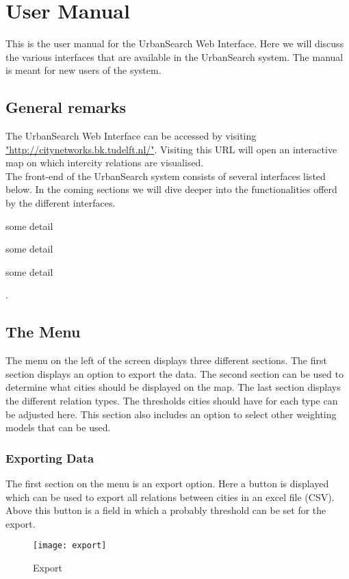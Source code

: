 \chapter{User Manual}
This is the user manual for the UrbanSearch Web Interface. Here we will discuss the various interfaces that are available in the UrbanSearch system. The manual is meant for new users of the system.

\section{General remarks}
The UrbanSearch Web Interface can be accessed by visiting \url{"http://citynetworks.bk.tudelft.nl/"}. Visiting this URL will open an interactive map on which intercity relations are visualised.\\
The front-end of the UrbanSearch system consists of several interfaces listed below. In the coming sections we will dive deeper into the functionalities offerd by the different interfaces.

\begin{description}[align=left]
\item [Map] some detail
\item [Classification] some detail
\item [Classifier] some detail
\end{description}. 


\section{The Menu}
The menu on the left of the screen displays three different sections. The first section displays an option to export the data. The second section can be used to determine what cities should be displayed on the map. The last section displays the different relation types. The thresholds cities should have for each type can be adjusted here. This section also includes an option to select other weighting models that can be used.


\subsection{Exporting Data}
The first section on the menu is an export option. Here a button is displayed which can be used to export all relations between cities in an excel file (CSV). Above this button is a field in which a probably threshold can be set for the export. 

\begin{figure}[H]
    \centering
    \texttt{[image: export]}
    \caption{Export}
    \label{fig:infoflow}
\end{figure}



